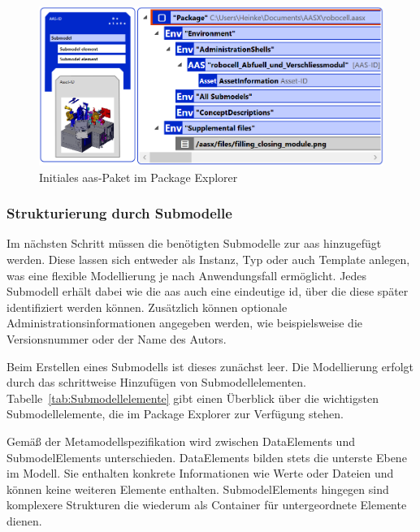 \begin{figure}[htbp]
    \centering
    \includegraphics[width=\textwidth]{Bilder/ModellierungAAS/Final/AASPaketPackageExplorer.PNG}
    \caption[Initiales \acs{aas}-Paket im Package Explorer]{Initiales \acs{aas}-Paket im Package Explorer}
    \label{fig:NeuesAASPaket}
\end{figure}



\subsubsection*{Strukturierung durch Submodelle}
\vspace{-0.5em}

Im nächsten Schritt müssen die benötigten Submodelle zur \acs{aas} hinzugefügt werden.
Diese lassen sich entweder als Instanz, Typ oder auch Template anlegen, was eine flexible Modellierung je nach Anwendungsfall ermöglicht.
Jedes Submodell erhält dabei wie die \acs{aas} auch eine eindeutige \acs{id}, über die diese später identifiziert werden können.
Zusätzlich können optionale Administrationsinformationen angegeben werden, wie beispielsweise die Versionsnummer oder der Name des Autors.

Beim Erstellen eines Submodells ist dieses zunächst leer. 
Die Modellierung erfolgt durch das schrittweise Hinzufügen von Submodellelementen.
Tabelle~\ref{tab:Submodellelemente} gibt einen Überblick über die wichtigsten Submodellelemente, die im Package Explorer zur Verfügung stehen.


\vspace{-0.5em}

Gemäß der Metamodellspezifikation \cite{SpezifikationPart1} wird zwischen DataElements und SubmodelElements unterschieden.
DataElements bilden stets die unterste Ebene im Modell. Sie enthalten konkrete Informationen wie Werte oder Dateien und können keine weiteren Elemente enthalten.
SubmodelElements hingegen sind komplexere Strukturen die wiederum als Container für untergeordnete Elemente dienen.

